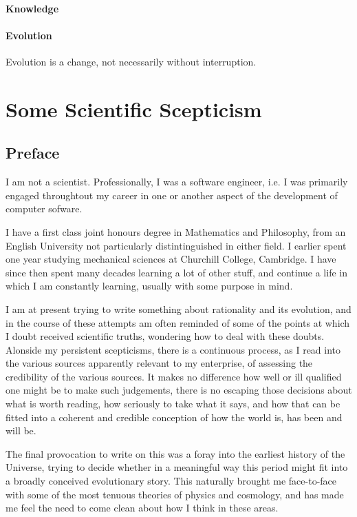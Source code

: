 \documentclass[10pt,titlepage]{book}
\begin{document}
\subsubsection{Knowledge}

\subsubsection{Evolution}

Evolution is a change, not necessarily without interruption.


\chapter{Some Scientific Scepticism}

\section{Preface}

I am not a scientist.
Professionally, I was a software engineer, i.e. I was primarily engaged throughtout my career in one or another aspect of the development of computer sofware.

I have a first class joint honours degree in Mathematics and Philosophy, from an English University not particularly distintinguished in either field.
I earlier spent one year studying mechanical sciences at Churchill College, Cambridge.
I have since then spent many decades learning a lot of other stuff, and continue a life in which I am constantly learning, usually with some purpose in mind.

I am at present trying to write something about rationality and its evolution, and in the course of these attempts am often reminded of some of the points at which I doubt received scientific truths, wondering how to deal with these doubts.
Alonside my persistent scepticisms, there is a continuous process, as I read into the various sources apparently relevant to my enterprise, of assessing the credibility of the various sources.
It makes no difference how well or ill qualified one might be to make such judgements, there is no escaping those decisions about what is worth reading, how seriously to take what it says, and how that can be fitted into a coherent and credible conception of how the world is, has been and will be.

The final provocation to write on this was a foray into the earliest history of the Universe, trying to decide whether in a meaningful way this period might fit into a broadly conceived evolutionary story.
This naturally brought me face-to-face with some of the most tenuous theories of physics and cosmology, and has made me feel the need to come clean about how I think in these areas.
\end{document}
